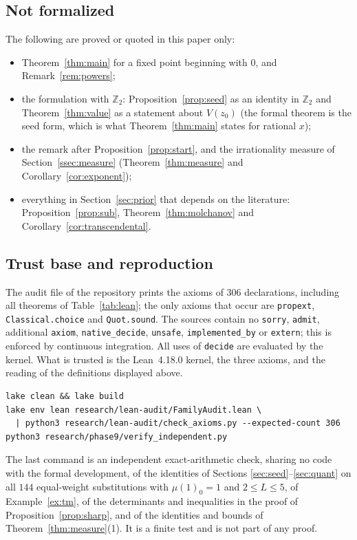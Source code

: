 \documentclass[11pt,reqno]{amsart}
\theoremstyle{definition}
\theoremstyle{remark}
\newcommand{\Zt}{\mathbb{Z}_2}
\begin{document}
\subsection{Not formalized}
The following are proved or quoted in this paper only:
\begin{itemize}
\item Theorem~\ref{thm:main} for a fixed point beginning with $0$, and
Remark~\ref{rem:powers};
\item the formulation with $\Zt$: Proposition~\ref{prop:seed} as an identity
in $\Zt$ and Theorem~\ref{thm:value} as a statement about $V(z_0)$ (the
formal theorem is the seed form, which is what Theorem~\ref{thm:main}
states for rational $x$);
\item the remark after Proposition~\ref{prop:start}, and the irrationality
measure of Section~\ref{ssec:measure} (Theorem~\ref{thm:measure} and
Corollary~\ref{cor:exponent});
\item everything in Section~\ref{sec:prior} that depends on the literature:
Proposition~\ref{prop:sub}, Theorem~\ref{thm:molchanov} and
Corollary~\ref{cor:transcendental}.
\end{itemize}

\subsection{Trust base and reproduction}
The audit file of the repository prints the axioms of $306$ declarations,
including all theorems of Table~\ref{tab:lean}; the only axioms that occur
are \texttt{propext}, \texttt{Classical.choice} and \texttt{Quot.sound}.
The sources contain no \texttt{sorry}, \texttt{admit}, additional
\texttt{axiom}, \texttt{native\_decide}, \texttt{unsafe},
\texttt{implemented\_by} or \texttt{extern}; this is enforced by continuous
integration.  All uses of \texttt{decide} are evaluated by the kernel.
What is trusted is the Lean~4.18.0 kernel, the three axioms, and the
reading of the definitions displayed above.
\begin{verbatim}
lake clean && lake build
lake env lean research/lean-audit/FamilyAudit.lean \
  | python3 research/lean-audit/check_axioms.py --expected-count 306
python3 research/phase9/verify_independent.py
\end{verbatim}
The last command is an independent exact-arithmetic check, sharing no code
with the formal development, of the identities of Sections
\ref{sec:seed}--\ref{sec:quant} on all $144$ equal-weight substitutions
with $\mu(1)_0=1$ and $2\le L\le 5$, of Example~\ref{ex:tm}, of the
determinants and inequalities in the proof of
Proposition~\ref{prop:sharp}, and of the identities and bounds of
Theorem~\ref{thm:measure}(1).  It is a finite test and is not part of any
proof.
\end{document}
